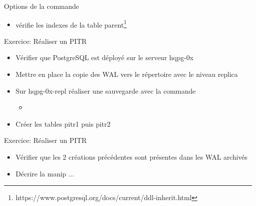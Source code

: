 
\begin{frame}{Options de la commande }

\begin{itemize}
   \item {} vérifie les indexes de la table parent\footnote{https://www.postgresql.org/docs/current/ddl-inherit.html}
\end{itemize}

\end{frame}


\begin{frame}{Exercice: Réaliser un PITR}

\begin{itemize}
   \item Vérifier que PostgreSQL est déployé sur le serveur \textsf{hqpg-0x}
   \item Mettre en place la copie des WAL vers le répertoire  avec le niveau \textsf{replica}
   \item Sur \textsf{hqpg-0x-repl} réaliser une sauvegarde avec la commande 
   \begin{itemize}
      \item {}
   \end{itemize}
   \item Créer les tables pitr1 puis pitr2
\end{itemize}

\end{frame}


\begin{frame}{Exercice: Réaliser un PITR}

\begin{itemize}
   \item Vérifier que les 2 créations précédentes sont présentes dans les WAL archivés
   \item Décrire la manip ...
\end{itemize}

\end{frame}


